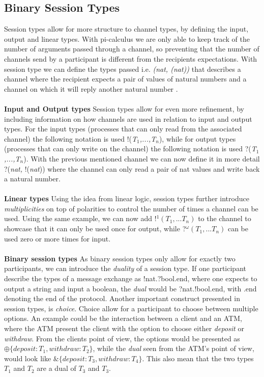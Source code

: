 \subsection{Binary Session Types}
Session types allow for more structure to channel types, by defining the input, output and linear types. With pi-calculus we are only able to keep track of the number of arguments passed through a channel, so preventing that the number of channels send by a participant is different from the recipients expectations. With session type we can define the types passed i.e. \textit{(nat, (nat))} that describes a channel where the recipient expects a pair of values of natural numbers and a channel on which it will reply another natural number \autocite{DBLP:journals/csur/HuttelLVCCDMPRT16}. \\ \\
\textbf{Input and Output types} \qquad
Session types allow for even more refinement, by including information on how channels are used in relation to input and output types. For the input types (processes that can only read from the associated channel) the following notation is used !(\textit{T$_1$,...,T$_n$}), while for output types (processes that can only write on the channel) the following notation is used ?(\textit{T$_1$,...,T$_n$}). With the previous mentioned channel we can now define it in more detail ?(\textit{nat, }!(\textit{nat})) where the channel can only read a pair of nat values and write back a natural number. \\ \\
\textbf{Linear types}  \qquad 
Using the idea from linear logic, session types further introduce \textit{multiplicities} on top of polarities to control the number of times a channel can be used. Using the same example, we can now add !$^1(T_1,...T_n)$ to the channel to showcase that it can only be used once for output, while ?$^\omega (T_1,...T_n)$ can be used zero or more times for input. \\ \\
\textbf{Binary session types} \qquad 
As binary session types only allow for exactly two participants, we can introduce the \textit{duality} of a session type. If one participant describe the types of a message exchange as !nat.?bool.end, where one expects to output a string and input a boolean, the \textit{dual} would be ?nat.!bool.end, with .end denoting the end of the protocol. Another important construct presented in session types, is \textit{choice}. Choice allow for a participant to choose between multiple options. An example could be the interaction between a client and an ATM, where the ATM present the client with the option to choose either \textit{deposit} or \textit{withdraw}. From the clients point of view, the options would be presented as $\oplus \{ deposit : T_1, withdraw : T_2\}$, while the \textit{dual} seen from the ATM's point of view, would look like $\&\{deposit : T_3, withdraw : T_4\}$. This also mean that the two types $T_1$ and $T_2$ are a dual of $T_3$ and $T_3$. \\


